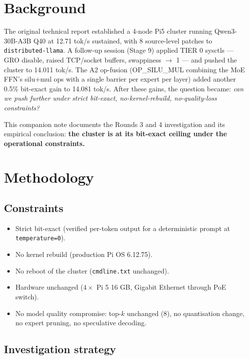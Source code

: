 \documentclass[10pt,a4paper]{article}
\begin{document}
\section{Background}

The original technical report \cite{originalreport} established a 4-node Pi5 cluster running Qwen3-30B-A3B Q40 at 12.71 tok/s sustained, with 8 source-level patches to \texttt{distributed-llama}. A follow-up session (Stage 9) applied TIER 0 sysctls --- GRO disable, raised TCP/socket buffers, swappiness $\to$ 1 --- and pushed the cluster to 14.011 tok/s. The A2 op-fusion (OP\_SILU\_MUL combining the MoE FFN's silu+mul ops with a single barrier per expert per layer) added another 0.5\% bit-exact gain to 14.081 tok/s. After these gains, the question became: \emph{can we push further under strict bit-exact, no-kernel-rebuild, no-quality-loss constraints?}

This companion note documents the Rounds 3 and 4 investigation and its empirical conclusion: \textbf{the cluster is at its bit-exact ceiling under the operational constraints.}

\section{Methodology}

\subsection{Constraints}

\begin{itemize}[leftmargin=*,nosep]
  \item Strict bit-exact (verified per-token output for a deterministic prompt at \texttt{temperature=0}).
  \item No kernel rebuild (production Pi OS 6.12.75).
  \item No reboot of the cluster (\texttt{cmdline.txt} unchanged).
  \item Hardware unchanged ($4 \times$ Pi 5 16 GB, Gigabit Ethernet through PoE switch).
  \item No model quality compromise: top-$k$ unchanged (8), no quantisation change, no expert pruning, no speculative decoding.
\end{itemize}

\subsection{Investigation strategy}
\end{document}
